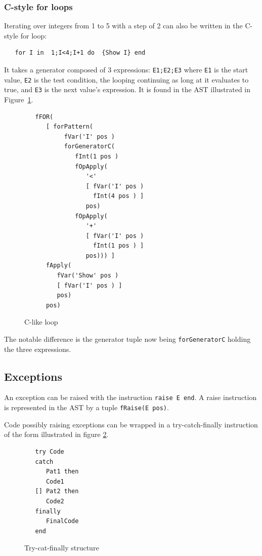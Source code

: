 \documentclass[a4paper]{memoir}
\begin{document}
\subsubsection{C-style for loops}
Iterating over integers from 1 to 5 with a step of 2 can also be written in the C-style for loop:
\begin{lstlisting}
   for I in  1;I<4;I+1 do  {Show I} end
\end{lstlisting}
It takes a generator composed of 3 expressions: \lstinline!E1;E2;E3! where
\lstinline!E1! is the start value, \lstinline!E2! is the test condition, the
looping continuing as long at it evaluates to true, and \lstinline!E3! is the
next value's expression.
It is found in the AST illustrated in Figure~\ref{fig:forc}.
\begin{figure}[h]
\begin{lstlisting}
   fFOR(
      [ forPattern(
           fVar('I' pos )
           forGeneratorC(
              fInt(1 pos )
              fOpApply(
                 '<'
                 [ fVar('I' pos )
                   fInt(4 pos ) ]
                 pos)
              fOpApply(
                 '+'
                 [ fVar('I' pos )
                   fInt(1 pos ) ]
                 pos))) ]
      fApply(
         fVar('Show' pos )
         [ fVar('I' pos ) ]
         pos)
      pos)
\end{lstlisting}
\caption{C-like loop}
\label{fig:forc}
\end{figure}


The notable difference is the generator tuple now being
\lstinline!forGeneratorC! holding the three expressions.

\subsection{Exceptions}\label{sec:input:exceptions}
An exception can be raised with the instruction \lstinline!raise E end!.
A raise instruction is represented in the AST by a tuple \lstinline!fRaise(E pos)!.

Code possibly raising exceptions can be wrapped in a try-catch-finally
instruction of the form illustrated in figure \ref{fig:trycatchfinally}.
\begin{figure}[h]
\begin{lstlisting}
   try Code
   catch
      Pat1 then
      Code1
   [] Pat2 then
      Code2
   finally
      FinalCode
   end
\end{lstlisting}
\caption{Try-cat-finally structure}
\label{fig:trycatchfinally}
\end{figure}
\end{document}
